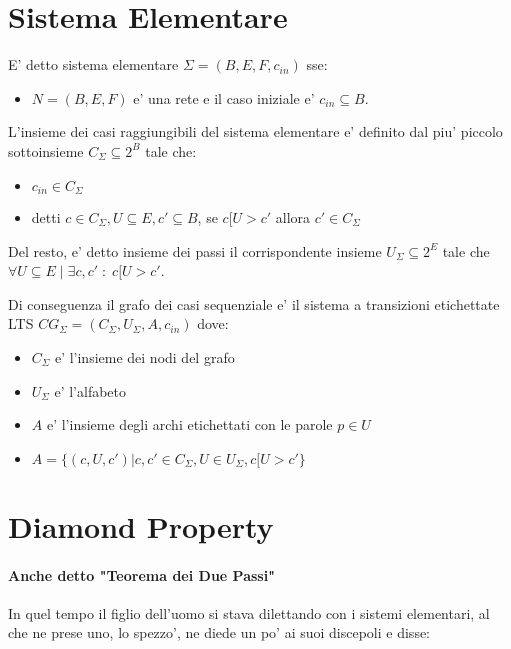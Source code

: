 \section{Sistema Elementare}

E' detto sistema elementare $\Sigma = (B, E, F, c_{in})$ sse:
\begin{itemize}
  \item $N = (B, E, F)$ e' una rete e il caso iniziale e' $c_{in} \subseteq B$.
\end{itemize}

L'insieme dei casi raggiungibili del sistema elementare e' definito dal piu' piccolo sottoinsieme $C_\Sigma \subseteq 2^B$ tale che:
\begin{itemize}
  \item $c_{in} \in C_\Sigma$
  \item detti $c \in C_\Sigma, U \subseteq E, c' \subseteq B$, se $c[U>c'$ allora $c' \in C_\Sigma$
\end{itemize}

Del resto, e' detto insieme dei passi il corrispondente insieme $U_\Sigma \subseteq 2^E$ tale che \\ $\forall U \subseteq E \; | \; \exists c,c' \; : \; c[U>c'$.

Di conseguenza il grafo dei casi sequenziale e' il sistema a transizioni etichettate LTS $CG_\Sigma = (C_\Sigma, U_\Sigma, A, c_{in})$ dove:
\begin{itemize}
  \item $C_\Sigma$ e' l'insieme dei nodi del grafo
  \item $U_\Sigma$ e' l'alfabeto
  \item $A$ e' l'insieme degli archi etichettati con le parole $p \in U$
  \item $A = \{ (c, U, c') | c,c' \in C_\Sigma, U \in U_\Sigma, c[U>c'\}$
\end{itemize}

\section{Diamond Property}

\paragraph{Anche detto "Teorema dei Due Passi"}

In quel tempo il figlio dell'uomo si stava dilettando con i sistemi elementari, al che ne prese uno, lo spezzo', ne diede un po' ai suoi discepoli e disse:

